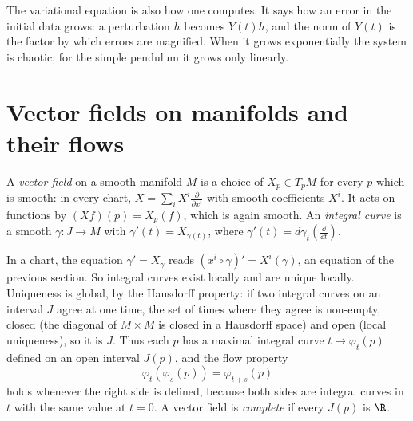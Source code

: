 The variational equation is also how one computes. It says how an error in the initial data grows: a perturbation $h$ becomes $Y(t)h$, and the norm of
$Y(t)$ is the factor by which errors are magnified. When it grows exponentially the system is chaotic; for the simple pendulum it grows only
linearly.

\section{Vector fields on manifolds and their flows}

\begin{definition}
A \emph{vector field} on a smooth manifold $M$ is a choice of $X_p\in T_pM$ for every $p$ which is smooth: in every chart,
$X=\sum_iX^i\frac{\partial}{\partial x^i}$ with smooth coefficients $X^i$. It acts on functions by $(Xf)(p)=X_p(f)$, which is again smooth. An
\emph{integral curve} is a smooth $\gamma\colon J\to M$ with $\gamma'(t)=X_{\gamma(t)}$, where $\gamma'(t)=d\gamma_t(\frac{\dd}{\dd t})$.
\end{definition}

In a chart, the equation $\gamma'=X_\gamma$ reads $(x^i\circ\gamma)'=X^i(\gamma)$, an equation of the previous section. So integral curves exist locally
and are unique locally. Uniqueness is global, by the Hausdorff property: if two integral curves on an interval $J$ agree at one time, the set of times where
they agree is non-empty, closed (the diagonal of $M\times M$ is closed in a Hausdorff space) and open (local uniqueness), so it is $J$. Thus each $p$ has a
maximal integral curve $t\mapsto\varphi_t(p)$ defined on an open interval $J(p)$, and the flow property
\[
\varphi_t(\varphi_s(p))=\varphi_{t+s}(p)
\]
holds whenever the right side is defined, because both sides are integral curves in $t$ with the same value at $t=0$. A vector field is \emph{complete} if
every $J(p)$ is $\R$.

